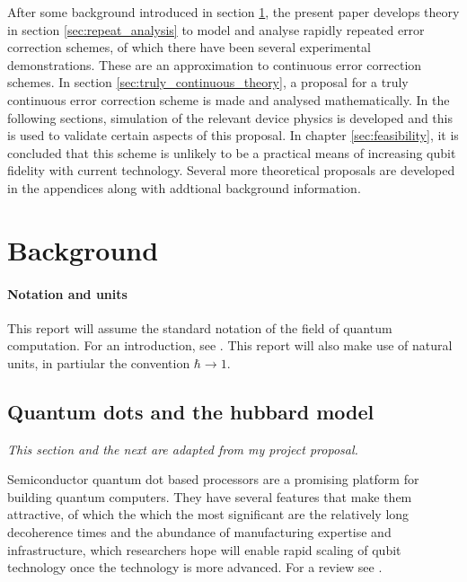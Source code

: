 \documentclass{report}
\begin{document}
After some background introduced in section \ref{chapter:background}, the present paper develops theory in section \ref{sec:repeat_analysis} to model and analyse rapidly repeated error correction schemes, of which there have been several experimental demonstrations. These are an approximation to continuous error correction schemes. In section \ref{sec:truly_continuous_theory}, a proposal for a truly continuous error correction scheme is made and analysed mathematically. In the following sections, simulation of the relevant device physics is developed and this is used to validate certain aspects of this proposal. In chapter \ref{sec:feasibility}, it is concluded that this scheme is unlikely to be a practical means of increasing qubit fidelity with current technology. Several more theoretical proposals are developed in the appendices along with addtional background information.

\chapter{Background}\label{chapter:background}
\subsubsection{Notation and units}
This report will assume the standard notation of the field of quantum computation. For an introduction, see \cite{Nielsen2010}. This report will also make use of natural units, in partiular the convention $\hbar \rightarrow 1$.


\section{Quantum dots and the hubbard model}\label{sec:hubbard_model}
\textit{This section and the next are adapted from my project proposal.}

Semiconductor quantum dot based processors are a promising platform for building quantum computers. They have several features that make them attractive, of which the which the most significant are the relatively long decoherence times \cite{Loss2022} and the abundance of manufacturing expertise and infrastructure, which researchers hope will enable rapid scaling of qubit technology once the technology is more advanced. For a review see \cite{Burkard2022}. 
\end{document}
